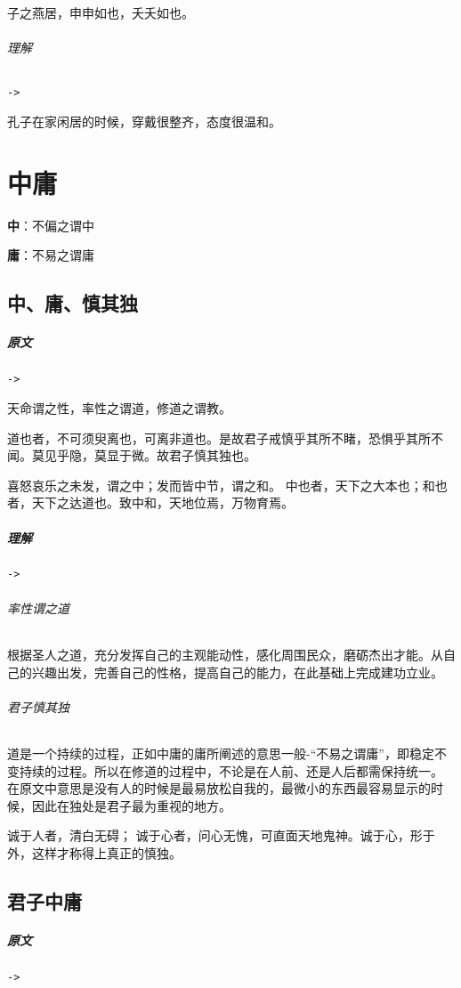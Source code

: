 \documentclass[UTF8,a4paper,8pt]{ctexbook}
\begin{document}
				子之燕居，申申如也，夭夭如也。
			
			\subparagraph{理解}\verb|->|
			
				孔子在家闲居的时候，穿戴很整齐，态度很温和。
			
\chapter{中庸}
	\textbf{中}：不偏之谓中
	
	\textbf{庸}：不易之谓庸
	
	\section{中、庸、慎其独}
		\paragraph{原文}\verb|->|
		
			天命谓之性，率性之谓道，修道之谓教。
			
			道也者，不可须臾离也，可离非道也。是故君子戒慎乎其所不睹，恐惧乎其所不闻。莫见乎隐，莫显于微。故君子慎其独也。
		
			喜怒哀乐之未发，谓之中；发而皆中节，谓之和。 中也者，天下之大本也；和也者，天下之达道也。致中和，天地位焉，万物育焉。
			
		\paragraph{理解}\verb|->|
			
			\subparagraph{率性谓之道} 根据圣人之道，充分发挥自己的主观能动性，感化周围民众，磨砺杰出才能。从自己的兴趣出发，完善自己的性格，提高自己的能力，在此基础上完成建功立业。
			
			\subparagraph{君子慎其独} 道是一个持续的过程，正如中庸的庸所阐述的意思一般-“不易之谓庸”，即稳定不变持续的过程。所以在修道的过程中，不论是在人前、还是人后都需保持统一。 在原文中意思是没有人的时候是最易放松自我的，最微小的东西最容易显示的时候，因此在独处是君子最为重视的地方。
			
			诚于人者，清白无碍； 诚于心者，问心无愧，可直面天地鬼神。诚于心，形于外，这样才称得上真正的慎独。
	
	\section{君子中庸}
			\paragraph{原文}\verb|->|
				
\end{document}
